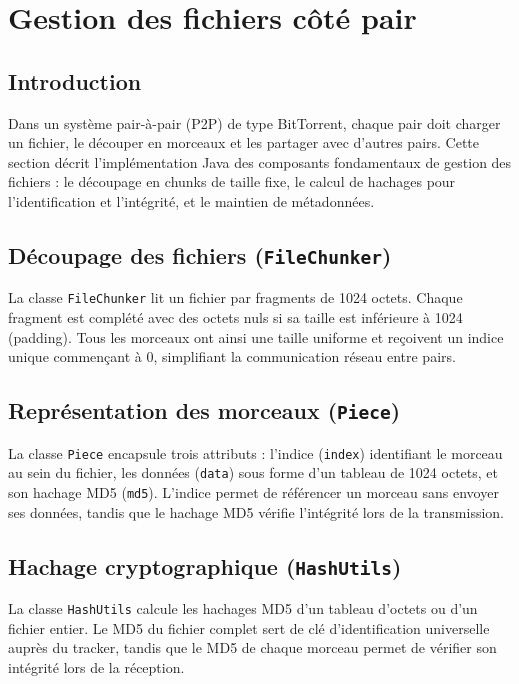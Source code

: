 
\section{Gestion des fichiers côté pair}

\subsection{Introduction}

Dans un système pair-à-pair (P2P) de type BitTorrent, chaque pair doit charger un fichier, le découper en morceaux et les partager avec d'autres pairs. Cette section décrit l'implémentation Java des composants fondamentaux de gestion des fichiers : le découpage en chunks de taille fixe, le calcul de hachages pour l'identification et l'intégrité, et le maintien de métadonnées.

\subsection{Découpage des fichiers (\texttt{FileChunker})}

La classe \texttt{FileChunker} lit un fichier par fragments de 1024 octets. Chaque fragment est complété avec des octets nuls si sa taille est inférieure à 1024 (padding). Tous les morceaux ont ainsi une taille uniforme et reçoivent un indice unique commençant à 0, simplifiant la communication réseau entre pairs.

\subsection{Représentation des morceaux (\texttt{Piece})}

La classe \texttt{Piece} encapsule trois attributs : l'indice (\texttt{index}) identifiant le morceau au sein du fichier, les données (\texttt{data}) sous forme d'un tableau de 1024 octets, et son hachage MD5 (\texttt{md5}). L'indice permet de référencer un morceau sans envoyer ses données, tandis que le hachage MD5 vérifie l'intégrité lors de la transmission.

\subsection{Hachage cryptographique (\texttt{HashUtils})}

La classe \texttt{HashUtils} calcule les hachages MD5 d'un tableau d'octets ou d'un fichier entier. Le MD5 du fichier complet sert de clé d'identification universelle auprès du tracker, tandis que le MD5 de chaque morceau permet de vérifier son intégrité lors de la réception.

